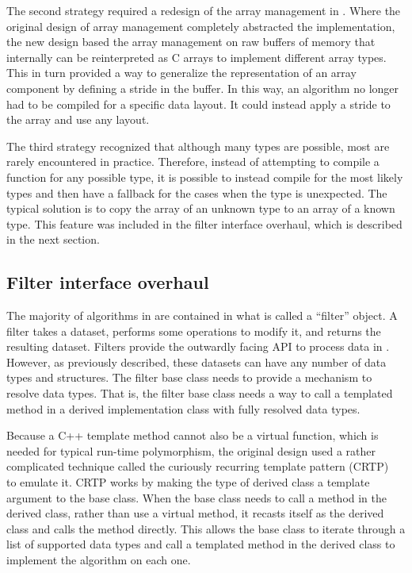 The second strategy required a redesign of the array management in \vtkm.
Where the original design of array management completely abstracted the implementation, the new design based the array management on raw buffers of memory that internally can be reinterpreted as C arrays to implement different array types.
This in turn provided a way to generalize the representation of an array component by defining a stride in the buffer.
In this way, an algorithm no longer had to be compiled for a specific data layout.
It could instead apply a stride to the array and use any layout.

The third strategy recognized that although many types are possible, most are rarely encountered in practice.
Therefore, instead of attempting to compile a function for any possible type, it is possible to instead compile for the most likely types and then have a fallback for the cases when the type is unexpected.
The typical solution is to copy the array of an unknown type to an array of a known type.
This feature was included in the filter interface overhaul, which is described in the next section.

\subsection{Filter interface overhaul}
\label{sec:filter-overhaul}


The majority of algorithms in \vtkm are contained in what is called a ``filter'' object.
A filter takes a dataset, performs some operations to modify it, and returns the resulting dataset.
Filters provide the outwardly facing API to process data in \vtkm.
However, as previously described, these datasets can have any number of data types and structures.
The \vtkm filter base class needs to provide a mechanism to resolve data types.
That is, the filter base class needs a way to call a templated method in a derived implementation class with fully resolved data types.

Because a C++ template method cannot also be a virtual function, which is needed for typical run-time polymorphism, the original design used a rather complicated technique called the curiously recurring template pattern (CRTP)~\citep{Coplien1995} to emulate it.
CRTP works by making the type of derived class a template argument to the base class.
When the base class needs to call a method in the derived class, rather than use a virtual method, it recasts itself as the derived class and calls the method directly.
This allows the base class to iterate through a list of supported data types and call a templated method in the derived class to implement the algorithm on each one.

